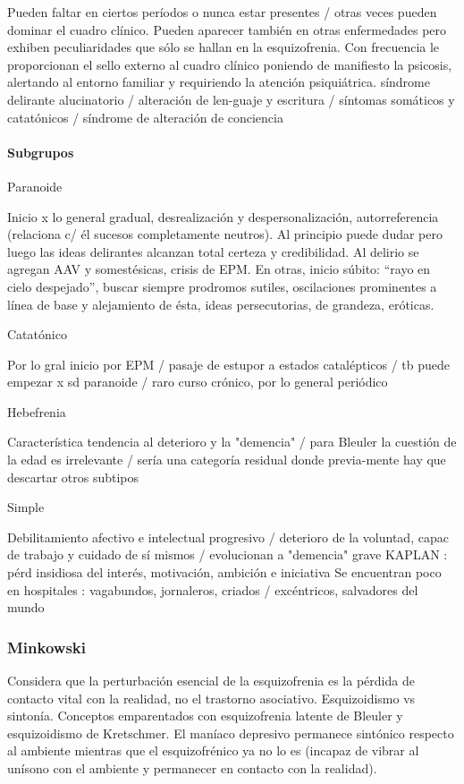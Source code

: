 Pueden faltar en ciertos períodos o nunca estar presentes / otras veces pueden dominar el cuadro clínico. Pueden aparecer también en otras enfermedades pero exhiben peculiaridades que sólo se hallan en la esquizofrenia. Con frecuencia le proporcionan el sello externo al cuadro clínico poniendo de manifiesto la psicosis, alertando al entorno familiar y requiriendo la atención psiquiátrica. síndrome delirante alucinatorio / alteración de len-guaje y escritura / síntomas somáticos y catatónicos / síndrome de alteración de conciencia

\paragraph*{Subgrupos}

Paranoide

Inicio x lo general gradual, desrealización y despersonalización, autorreferencia (relaciona c/ él sucesos completamente neutros). Al principio puede dudar pero luego las ideas delirantes alcanzan total certeza y credibilidad. Al delirio se agregan AAV y somestésicas, crisis de EPM. En otras, inicio súbito: “rayo en cielo despejado”, buscar siempre prodromos sutiles, oscilaciones prominentes a línea de base y alejamiento de ésta, ideas persecutorias, de grandeza, eróticas.

Catatónico

Por lo gral inicio por EPM / pasaje de estupor a estados catalépticos / tb puede empezar x sd paranoide / raro curso crónico, por lo general periódico

Hebefrenia

Característica tendencia al deterioro y la "demencia" / para Bleuler la cuestión de la edad es irrelevante / sería una categoría residual donde previa-mente hay que descartar otros subtipos

Simple

Debilitamiento afectivo e intelectual progresivo / deterioro de la voluntad, capac de trabajo y cuidado de sí mismos / evolucionan a "demencia" grave KAPLAN : pérd insidiosa del interés, motivación, ambición e iniciativa Se encuentran poco en hospitales : vagabundos, jornaleros, criados / excéntricos, salvadores del mundo

\subsubsection*{Minkowski}

Considera que la perturbación esencial de la esquizofrenia es la pérdida de contacto vital con la realidad, no el trastorno asociativo. Esquizoidismo vs sintonía. Conceptos emparentados con esquizofrenia latente de Bleuler y esquizoidismo de Kretschmer. El maníaco depresivo permanece sintónico respecto al ambiente mientras que el esquizofrénico ya no lo es (incapaz de vibrar al unísono con el ambiente y permanecer en contacto con la realidad).


